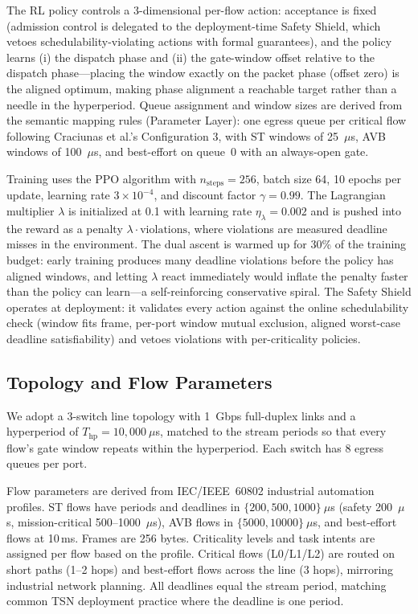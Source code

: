 \documentclass[conference]{IEEEtran}
\begin{document}
The RL policy controls a 3-dimensional per-flow action: acceptance is fixed (admission control is delegated to the deployment-time Safety Shield, which vetoes schedulability-violating actions with formal guarantees), and the policy learns (i) the dispatch phase and (ii) the gate-window offset relative to the dispatch phase---placing the window exactly on the packet phase (offset zero) is the aligned optimum, making phase alignment a reachable target rather than a needle in the hyperperiod. Queue assignment and window sizes are derived from the semantic mapping rules (Parameter Layer): one egress queue per critical flow following Craciunas et al.'s Configuration 3, with ST windows of 25~$\mu$s, AVB windows of 100~$\mu$s, and best-effort on queue~0 with an always-open gate.

Training uses the PPO algorithm with $n_{\text{steps}} = 256$, batch size 64, 10 epochs per update, learning rate $3\times10^{-4}$, and discount factor $\gamma = 0.99$. The Lagrangian multiplier $\lambda$ is initialized at 0.1 with learning rate $\eta_\lambda = 0.002$ and is pushed into the reward as a penalty $\lambda \cdot \text{violations}$, where violations are measured deadline misses in the environment. The dual ascent is warmed up for 30\% of the training budget: early training produces many deadline violations before the policy has aligned windows, and letting $\lambda$ react immediately would inflate the penalty faster than the policy can learn---a self-reinforcing conservative spiral. The Safety Shield operates at deployment: it validates every action against the online schedulability check (window fits frame, per-port window mutual exclusion, aligned worst-case deadline satisfiability) and vetoes violations with per-criticality policies.

\subsection{Topology and Flow Parameters}

We adopt a 3-switch line topology with 1~Gbps full-duplex links and a hyperperiod of $T_{\text{hp}} = 10{,}000~\mu$s, matched to the stream periods so that every flow's gate window repeats within the hyperperiod. Each switch has 8 egress queues per port.

Flow parameters are derived from IEC/IEEE~60802 industrial automation profiles. ST flows have periods and deadlines in $\{200, 500, 1000\}~\mu$s (safety 200~$\mu$s, mission-critical 500--1000~$\mu$s), AVB flows in $\{5000, 10000\}~\mu$s, and best-effort flows at 10\,ms. Frames are 256 bytes. Criticality levels and task intents are assigned per flow based on the profile. Critical flows (L0/L1/L2) are routed on short paths (1--2 hops) and best-effort flows across the line (3 hops), mirroring industrial network planning. All deadlines equal the stream period, matching common TSN deployment practice where the deadline is one period.
\end{document}
